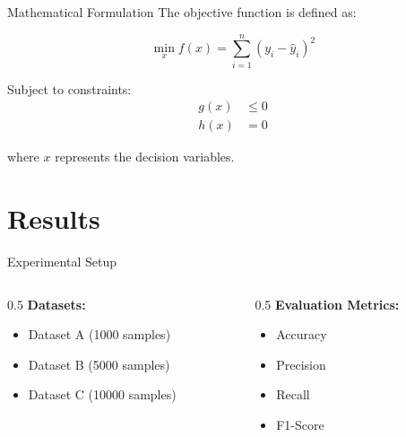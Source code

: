 \documentclass[aspectratio=169]{beamer}
\begin{document}
\begin{frame}{Mathematical Formulation}
    The objective function is defined as:
    
    \begin{equation}
        \min_{x} f(x) = \sum_{i=1}^{n} (y_i - \hat{y}_i)^2
    \end{equation}
    
    Subject to constraints:
    \begin{align}
        g(x) &\leq 0 \\
        h(x) &= 0
    \end{align}
    
    where $x$ represents the decision variables.
\end{frame}


\section{Results}

\begin{frame}{Experimental Setup}
    \begin{columns}[T]
        \begin{column}{0.5\textwidth}
            \textbf{Datasets:}
            \begin{itemize}
                \item Dataset A (1000 samples)
                \item Dataset B (5000 samples)
                \item Dataset C (10000 samples)
            \end{itemize}
        \end{column}
        
        \begin{column}{0.5\textwidth}
            \textbf{Evaluation Metrics:}
            \begin{itemize}
                \item Accuracy
                \item Precision
                \item Recall
                \item F1-Score
            \end{itemize}
        \end{column}
    \end{columns}
\end{frame}
\end{document}
